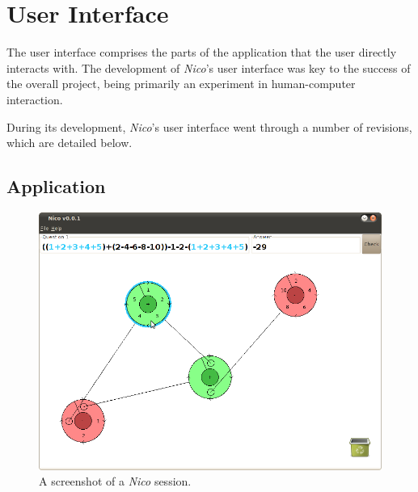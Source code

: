 \documentclass[12pt,twoside,notitlepage,xetex]{report}
\begin{document}
\section{User Interface}%

The user interface comprises the parts of the application that the user directly interacts with.  The development of \emph{Nico}'s user interface was key to the success of the overall project, being primarily an experiment in human-computer interaction.

During its development, \emph{Nico}'s user interface went through a number of revisions, which are detailed below.

\subsection{Application}

\begin{center}
\begin{figure}[H]
\begin{center}
\includegraphics[width=\textwidth]{figs/nico_screen_01.png}
\end{center}
\caption{A screenshot of a \emph{Nico} session.}
\label{fig:Nico1}
\end{figure}
\end{center}
\end{document}
